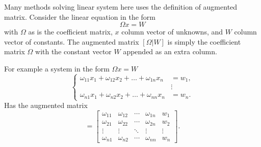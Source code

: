 \documentclass[../../../main.tex]{subfiles}
\begin{document}
Many methods solving linear system here uses the definition of augmented matrix.
Consider the linear  equation in the form
\begin{equation*}
    \Omega x=W
\end{equation*}
with $\Omega$ as is the coefficient matrix, $x$ column vector of unknowns, and $W$ column vector of constants.
The augmented matrix $[\Omega|W]$ is simply the coefficient matrix $\Omega$ with the constant vector $W$ appended as an extra column.

For example a system in the form $\Omega x=W$
\begin{equation*}
    \begin{cases}
        \omega_{11}x_1 + \omega_{12}x_2 + \dots + \omega_{1n}x_n & = w_1, \\
                                                  & \vdots      \\
        \omega_{n1}x_1 + \omega_{n2}x_2 + \dots + \omega_{nn}x_n & = w_n.
    \end{cases}
\end{equation*}
Has the augmented matrix
\begin{equation*}
    [\Omega|W] =
    \begin{bmatrix}
        \omega_{11} & \omega_{12} & \cdots & \omega_{1n} & w_1 \\
        \omega_{21} & \omega_{22} & \cdots & \omega_{2n} & w_2 \\
        \vdots & \vdots & \ddots & \vdots & \vdots   \\
        \omega_{n1} & \omega_{n2} & \cdots & \omega_{nn} & w_n
    \end{bmatrix}.
\end{equation*}
\end{document}
